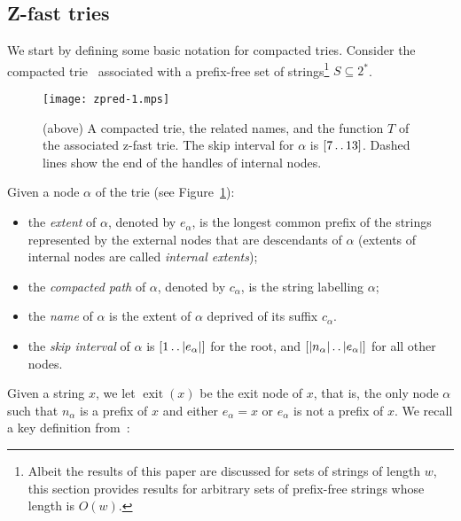 \documentclass{article}
\newcommand{\exit}[1]{\operatorname{exit}(#1)}
\newcommand{\?}{\mskip1.5mu}
\def\..{\,\mathpunct{\ldotp\ldotp}} %
\begin{document}
\subsection{Z-fast tries} 

We start by defining some basic notation for compacted tries. Consider the compacted
trie~\cite{KnuACP} associated with a prefix-free set of strings\footnote{Albeit
the results of this paper are discussed for sets of strings
of length $w$, this section provides results for arbitrary sets of prefix-free strings whose length is
$O(w)$.} $S\subseteq 2^*$. \begin{figure}[t]
\centering
\texttt{[image: zpred-1.mps]}\qquad{}
\caption{\label{fig:ztrie}(above) A compacted trie, the related names, and the
function $T$ of the associated z-fast trie. The skip interval for $\alpha$ is
$[7\..13]$. Dashed lines show the end of the handles of internal nodes.}
\end{figure}
Given a node $\alpha$ of the trie (see Figure~\ref{fig:ztrie}):
\begin{itemize}
	\item the \emph{extent} of $\alpha$, denoted by $e_\alpha$, is the longest
	common prefix of the strings represented by the external nodes 
	that are descendants of $\alpha$ (extents of internal nodes are called
	\emph{internal extents});
	\item the \emph{compacted path} of $\alpha$, denoted by $c_\alpha$, is the
	string labelling $\alpha$;
 	\item the \emph{name} of $\alpha$ is the extent of $\alpha$
 	deprived of its suffix $c_\alpha$.
	\item the \emph{skip interval} of $\alpha$ is $[1\..|e_\alpha|]$ for the root, and $[|n_\alpha|\..|e_\alpha|]$
	for all other nodes.
\end{itemize}

Given a string $x$, we let $\exit x$ be the exit node of $x$, that is, the
only node $\alpha$ such that $n_\alpha$ is a prefix of $x$ and
either $e_\alpha=x$ or $e_\alpha$ is not a prefix of $x$.
We recall a key definition from~\cite{BBPMMPH}:
\end{document}
